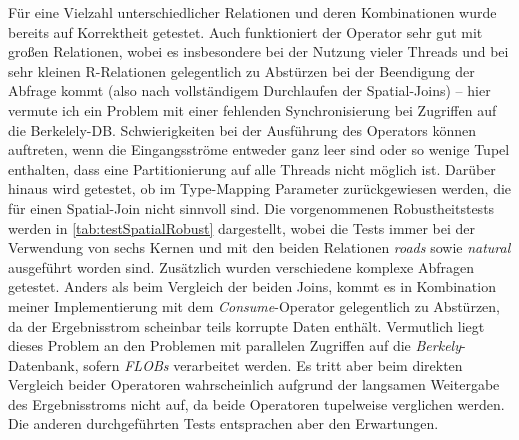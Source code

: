 \documentclass[a4paper,12pt,twoside]{article}
\newcommand{\Fb}[1]{\textit{#1}} %
\begin{document}
Für eine Vielzahl unterschiedlicher Relationen und deren Kombinationen wurde bereits auf Korrektheit getestet. Auch funktioniert der Operator sehr gut mit großen Relationen, wobei es insbesondere bei der Nutzung vieler Threads und bei sehr kleinen R-Relationen gelegentlich zu Abstürzen bei der Beendigung der Abfrage kommt (also nach vollständigem Durchlaufen der Spatial-Joins) -- hier vermute ich ein Problem mit einer fehlenden Synchronisierung bei Zugriffen auf die Berkelely-DB. Schwierigkeiten bei der Ausführung des Operators können auftreten, wenn die Eingangsströme entweder ganz leer sind oder so wenige Tupel enthalten, dass eine Partitionierung auf alle Threads nicht möglich ist. Darüber hinaus wird getestet, ob im Type-Mapping Parameter zurückgewiesen werden, die für einen Spatial-Join nicht sinnvoll sind. Die vorgenommenen Robustheitstests werden in \autoref{tab:testSpatialRobust} dargestellt, wobei die Tests immer bei der Verwendung von sechs Kernen und mit den beiden Relationen \Fb{roads} sowie \Fb{natural} ausgeführt worden sind. Zusätzlich wurden verschiedene komplexe Abfragen getestet. Anders als beim Vergleich der beiden Joins, kommt es in Kombination meiner Implementierung mit dem \Fb{Consume}-Operator gelegentlich zu Abstürzen, da der Ergebnisstrom scheinbar teils korrupte Daten enthält. Vermutlich liegt dieses Problem an den Problemen mit parallelen Zugriffen auf die \Fb{Berkely}-Datenbank, sofern \Fb{FLOBs} verarbeitet werden. Es tritt aber beim direkten Vergleich beider Operatoren wahrscheinlich aufgrund der langsamen Weitergabe des Ergebnisstroms nicht auf, da beide Operatoren tupelweise verglichen werden. Die anderen durchgeführten Tests entsprachen aber den Erwartungen.
\end{document}
